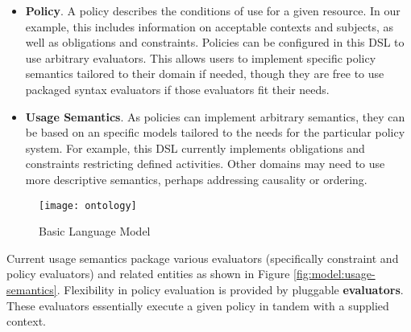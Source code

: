 \begin{itemize}
\begin{itemize}
\end{itemize}
\item \textbf{Policy}.  A policy describes the conditions of use for a given resource.  In our example, this includes information on acceptable contexts and subjects, as well as obligations and constraints.  Policies can be configured in this DSL to use arbitrary evaluators.  This allows users to implement specific policy semantics tailored to their domain if needed, though they are free to use packaged syntax evaluators if those evaluators fit their needs. 
\item \textbf{Usage Semantics}.  As policies can implement arbitrary semantics, they can be based on an specific models tailored to the needs for the particular policy system.  For example, this DSL currently implements obligations and constraints restricting defined activities.  Other domains may need to use more descriptive semantics, perhaps addressing causality or ordering.
\end{itemize}

\begin{figure}[!t]
\centering
\texttt{[image: ontology]}
\caption{Basic Language Model}
\label{fig:model:ontology}
\end{figure}

Current usage semantics package various evaluators (specifically constraint and policy evaluators) and related entities as shown in Figure \ref{fig:model:usage-semantics}. Flexibility in policy evaluation is provided by pluggable \textbf{evaluators}.  These evaluators essentially execute a given policy in tandem with a supplied context.

